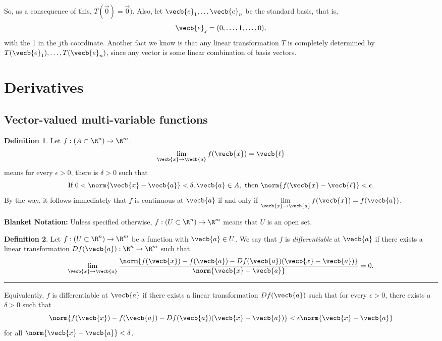 \documentclass[a5paper]{article}
\theoremstyle{definition}%
\newtheorem*{definition*}{Definition}
\numberwithin{exercise}{section}
\theoremstyle{remark}%
\begin{document}
So, as a consequence of this, $T(\vec{0})=\vec{0})$. Also, let $\vecb{e}_1, \ldots \vecb{e}_n$ be the standard basis, that is, 
$$\vecb{e}_j=(0,\ldots, 1, \ldots, 0),$$
with the 1 in the $j$th coordinate. Another fact we know is that any linear transformation $T$ is completely determined by $T(\vecb{e}_1), \ldots, T(\vecb{e}_n)$, since any vector is some linear combination of basis vectors. 

\section{Derivatives}

\subsection{Vector-valued multi-variable functions}

\begin{highlight}
\begin{definition*}
Let $f:(A\subset\R^n)\to\R^m$. \\
$$\lim_{\vecb{x}\to\vecb{a}} f(\vecb{x})=\vecb{\ell}$$ means for every $\epsilon>0$, there is $\delta>0$ such that 
$$\text{If } 0<\norm{\vecb{x}-\vecb{a}}<\delta, \vecb{a}\in A, \text{ then } \norm{f(\vecb{x}-\vecb{\ell}}<\epsilon.$$
By the way, it follows immediately that $f$ is continuous at $\vecb{a}$ if and only if $\lim\limits_{\vecb{x}\to\vecb{a}} f(\vecb{x})=f(\vecb{a})$. 
\end{definition*}
\end{highlight}

\textbf{Blanket Notation:} Unless specified otherwise, $f:(U\subset\R^n)\to\R^m$ means that $U$ is an open set.

\begin{highlight}
\begin{definition*}
Let $f:(U\subset\R^n)\to\R^m$ be a function with $\vecb{a}\in U$. We say that $f$ is \emph{differentiable}  at $\vecb{a}$ if there exists a linear transformation $Df(\vecb{a}):\R^n\to \R^m$ such that 
$$\lim_{\vecb{x}\to \vecb{a}} \frac{\norm{f(\vecb{x})-f(\vecb{a})-Df(\vecb{a})(\vecb{x}-\vecb{a})}}{\norm{\vecb{x}-\vecb{a}}}=0.$$
\hrule\mbox{}

\noindent Equivalently, $f$ is differentiable at $\vecb{a}$ if there exists a linear transformation $Df(\vecb{a})$ such that for every $\epsilon>0$, there exists a $\delta>0$ such that 
$$\norm{f(\vecb{x})-f(\vecb{a})-Df(\vecb{a})(\vecb{x}-\vecb{a})}<\epsilon \norm{\vecb{x}-\vecb{a}}$$
for all $\norm{\vecb{x}-\vecb{a}}<\delta$. 
\end{definition*}
\end{highlight}
\end{document}
